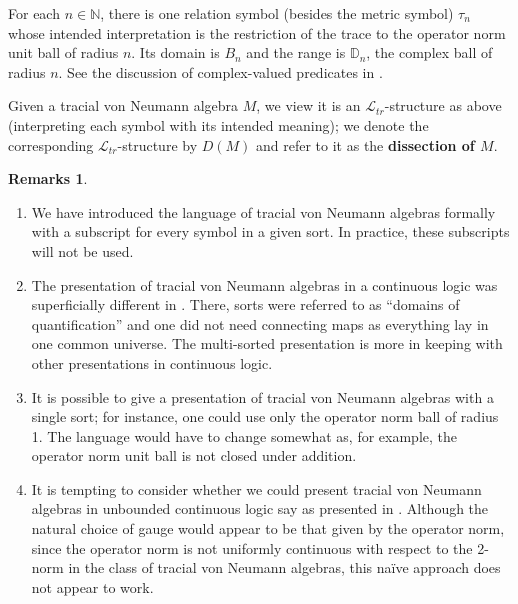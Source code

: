 \documentclass[12pt]{amsart}
\theoremstyle{definition}
\newtheorem{remarks}[thm]{Remarks}
\def\bb{\mathbb}
\def\bb{\mathbb}
\def\cal{\mathcal}
\newcommand\cL{{\cal L}}
\begin{document}
For each $n\in \bb N$, there is one relation symbol (besides the metric symbol) $\tau_n$ whose intended interpretation is the restriction of the trace to the operator norm unit ball of radius $n$.  Its domain is $B_n$ and the range is $\bb D_{n}$, the complex ball of radius $n$.  See the discussion of complex-valued predicates in \cite{}.

Given a tracial von Neumann algebra $M$, we view it is an $\cL_{tr}$-structure as above (interpreting each symbol with its intended meaning); we denote the corresponding $\cL_{tr}$-structure by $D(M)$ and refer to it as the \textbf{dissection of $M$}.

\begin{remarks}

\

\begin{enumerate}
    \item We have introduced the language of tracial von Neumann algebras formally with a subscript for every symbol in a given sort.  In practice, these subscripts will not be used.

 \item The presentation of tracial von Neumann algebras in a continuous logic was superficially different in \cite{mtoa2}.  There, sorts were referred to as ``domains of quantification'' and one did not need connecting maps as everything lay in one common universe. The multi-sorted presentation is more in keeping with other presentations in continuous logic.

\item It is possible to give a presentation of tracial von Neumann algebras with a single sort; for instance, one could use only the operator norm ball of radius 1.  The language would have to change somewhat as, for example, the operator norm unit ball is not closed under addition.

\item It is tempting to consider whether we could present tracial von Neumann algebras in unbounded continuous logic say as presented in \cite{unbdd}.  Although the natural choice of gauge would appear to be that given by the operator norm, since the operator norm is not uniformly continuous with respect to the 2-norm in the class of tracial von Neumann algebras, this na\"ive approach does not appear to work.
\end{enumerate}
\end{remarks}
\end{document}
